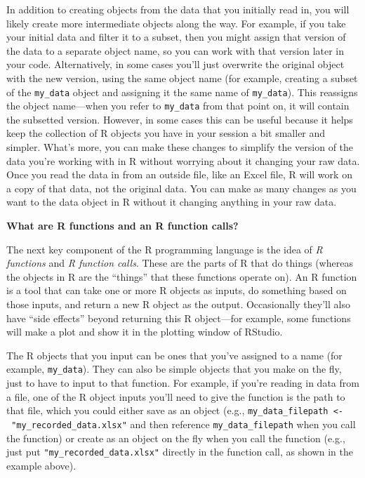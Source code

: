 \documentclass[]{tufte-book}
\begin{document}
In addition to creating objects from the data that you initially read in, you will
likely create more intermediate objects along the way. For example, if you take
your initial data and filter it to a subset, then you might assign that version
of the data to a separate object name, so you can work with that version later in
your code. Alternatively, in some cases you'll just overwrite the original object
with the new version, using the same object name (for example, creating a subset of
the \texttt{my\_data} object and assigning it the same name of \texttt{my\_data}). This reassigns the
object name---when you refer to \texttt{my\_data} from that point on, it will contain the
subsetted version. However, in some cases this can be useful because it helps keep
the collection of R objects you have in your session a bit smaller and simpler. What's
more, you can make these changes to simplify the version of the data you're working
with in R without worrying about it changing your raw data. Once you read the data
in from an outside file, like an Excel file, R will work on a copy of that data, not
the original data. You can make as many changes as you want to the data object in R
without it changing anything in your raw data.

\textbf{What are R functions and an R function calls?}

The next key component of the R programming language is the idea of \emph{R functions}
and \emph{R function calls}. These are the parts of R that do things (whereas the objects in R
are the ``things'' that these functions operate on). An R function is a tool that can
take one or more R objects as inputs, do something based on those inputs, and return a
new R object as the output. Occasionally they'll also have ``side effects'' beyond returning
this R object---for example, some functions will make a plot and show it in the plotting
window of RStudio.

The R objects that you input can be ones that you've assigned to a name (for
example, \texttt{my\_data}). They can also be simple objects that you make on the fly,
just to have to input to that function. For example, if you're reading in data
from a file, one of the R object inputs you'll need to give the function is the
path to that file, which you could either save as an object (e.g.,
\texttt{my\_data\_filepath\ \textless{}-\ "my\_recorded\_data.xlsx"} and then reference
\texttt{my\_data\_filepath} when you call the function) or create as an object on the fly
when you call the function (e.g., just put \texttt{"my\_recorded\_data.xlsx"} directly in
the function call, as shown in the example above).
\end{document}
